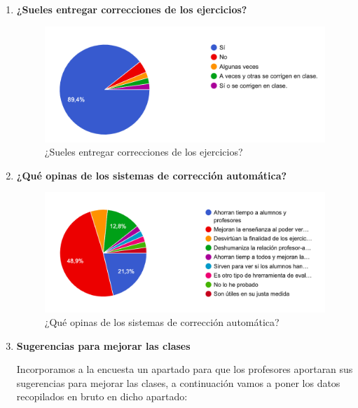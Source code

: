 \begin{enumerate}
\item \textbf{¿Sueles entregar correcciones de los ejercicios?}



\begin{figure}[H]
\centering
\includegraphics[width=1.0\textwidth]{../images/quiz_5}
\caption{¿Sueles entregar correcciones de los ejercicios?}
\label{fig:quiz_5}
\end{figure}




\item \textbf{¿Qué opinas de los sistemas de corrección automática?}



\begin{figure}[H]
\centering
\includegraphics[width=1.0\textwidth]{../images/quiz_6}
\caption{¿Qué opinas de los sistemas de corrección automática?}
\label{fig:quiz_6}
\end{figure}


\item \textbf{Sugerencias para mejorar las clases}

Incorporamos a la encuesta un apartado para que los profesores aportaran sus sugerencias para mejorar las clases, a continuación vamos a poner los datos recopilados en bruto en dicho apartado:


\end{enumerate}
